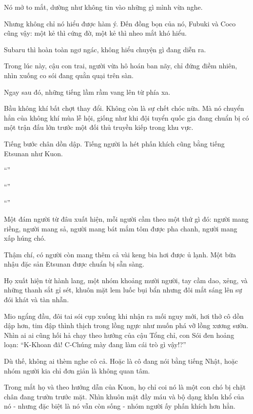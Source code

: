 \documentclass[../main.tex]{subfiles}
\begin{document}
Nó mở to mắt, dường như không tin vào những gì mình vừa nghe.

Nhưng không chỉ nó hiểu được hàm ý. Đến đồng bọn của nó, Fubuki và Coco cũng vậy: một kẻ thì cứng đờ, một kẻ thì nheo mắt khó hiểu.

Subaru thì hoàn toàn ngơ ngác, không hiểu chuyện gì đang diễn ra.

Trong lúc này, cậu con trai, người vừa hô hoán ban nãy, chỉ đứng điềm nhiên, nhìn xuống co sói đang quằn quại trên sàn.

Ngay sau đó, những tiếng lầm rầm vang lên từ phía xa.

Bầu không khí bất chợt thay đổi. Không còn là sự chết chóc nữa. Mà nó chuyển hẳn của không khí mùa lễ hội, giống như khi đội tuyển quốc gia đang chuẩn bị có một trận đấu lớn trước một đối thủ truyền kiếp trong khu vực.

Tiếng bước chân dồn dập. Tiếng người la hét phấn khích cũng bằng tiếng Etsunan như Kuon.

``\textbf{}''

``\textbf{}''

``\textbf{}''

Một đám người từ đâu xuất hiện, mỗi người cầm theo một thứ gì đó: người mang riềng, người mang sả, người mang bát mắm tôm được pha chanh, người mang xấp húng chó.

Thậm chí, có người còn mang thêm cả vài keng bia hơi được ủ lạnh. Một bữa nhậu đặc sản Etsunan được chuẩn bị sẵn sàng.

Họ xuất hiện từ hành lang, một nhóm khoảng mười người, tay cầm dao, xẻng, và những thanh sắt gỉ sét, khuôn mặt lem luốc bụi bẩn nhưng đôi mắt sáng lên sự đói khát và tàn nhẫn.

Mio ngẩng đầu, đôi tai sói cụp xuống khi nhận ra mối nguy mới, hơi thở cô dồn dập hơn, tim đập thình thịch trong lồng ngực như muốn phá vỡ lồng xương sườn. Nhìn ai ai cũng hối hả chạy theo hướng của cậu Tổng chỉ, con Sói đen hoảng loạn: ``K-Khoan đã! C-Chúng mày đang làm cái trò gì vậy!?''

Dù thế, không ai thèm nghe cô cả. Hoặc là cô đang nói bằng tiếng Nhật, hoặc nhóm người kia chỉ đơn giản là không quan tâm.

Trong mắt họ và theo hướng dẫn của Kuon, họ chỉ coi nó là một con chó bị chặt chân đang trườn trước mặt. Nhìn khuôn mặt đầy máu và bộ dạng khốn khổ của nó - nhưng đặc biệt là nó vẫn còn sống - nhóm người ấy phấn khích hơn hẳn.
\end{document}
